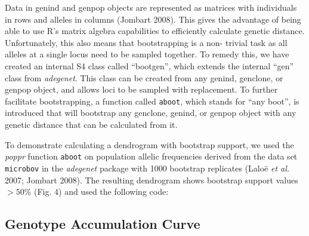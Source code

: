 \documentclass[double,12pt]{beavtex}
\begin{document}
  Data in genind and genpop objects are represented as matrices with
  individuals in rows and alleles in columns (Jombart 2008). This gives
  the advantage of being able to use R's matrix algebra capabilities to
  efficiently calculate genetic distance. Unfortunately, this also means
  that bootstrapping is a non- trivial task as all alleles at a single
  locus need to be sampled together. To remedy this, we have created an
  internal S4 class called ``bootgen'', which extends the internal ``gen''
  class from \emph{adegenet}. This class can be created from any genind,
  genclone, or genpop object, and allows loci to be sampled with
  replacement. To further facilitate bootstrapping, a function called
  \texttt{aboot}, which stands for ``any boot'', is introduced that will
  bootstrap any genclone, genind, or genpop object with any genetic
  distance that can be calculated from it.
  
  To demonstrate calculating a dendrogram with bootstrap support, we used
  the \emph{poppr} function \texttt{aboot} on population allelic
  frequencies derived from the data set \texttt{microbov} in the
  \emph{adegenet} package with 1000 bootstrap replicates (Laloë \emph{et
  al.} 2007; Jombart 2008). The resulting dendrogram shows bootstrap
  support values \(>50\%\) (Fig. 4) and used the following code:
  
  \begin{Shaded}
  \begin{Highlighting}[]
  \NormalTok{(}\NormalTok{)}
  \NormalTok{(}\NormalTok{, } \NormalTok{) }
  \StringTok{ }\NormalTok{(}
  \StringTok{ }\ErrorTok{~}
  \StringTok{ }
  
  \NormalTok{(}\NormalTok{)}
  \StringTok{ } \NormalTok{, } \NormalTok{)}
  \end{Highlighting}
  \end{Shaded}
  
  \subsection{Genotype Accumulation
  Curve}\label{genotype-accumulation-curve}
  
\end{document}
